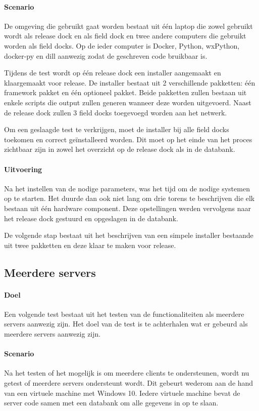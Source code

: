 \paragraph{Scenario}
De omgeving die gebruikt gaat worden bestaat uit één laptop die zowel gebruikt wordt als release dock en als field dock en twee andere computers die gebruikt worden als field docks.
Op de ieder computer is Docker, Python, wxPython, docker-py en dill aanwezig zodat de geschreven code bruikbaar is.

Tijdens de test wordt op één release dock een installer aangemaakt en klaargemaakt voor release.
De installer bestaat uit 2 verschillende pakketten: één framework pakket en één optioneel pakket.
Beide pakketten zullen bestaan uit enkele scripts die output zullen generen wanneer deze worden uitgevoerd.
Naast de release dock zullen 3 field docks toegevoegd worden aan het netwerk.

Om een geslaagde test te verkrijgen, moet de installer bij alle field docks toekomen en correct geïnstalleerd worden.
Dit moet op het einde van het proces zichtbaar zijn in zowel het overzicht op de release dock als in de databank.

\paragraph{Uitvoering}
Na het instellen van de nodige parameters, was het tijd om de nodige systemen op te starten.
Het duurde dan ook niet lang om drie torens te beschrijven die elk bestaan uit één hardware component.
Deze opstellingen werden vervolgens naar het release dock gestuurd en opgeslagen in de databank.

De volgende stap bestaat uit het beschrijven van een simpele installer bestaande uit twee pakketten en deze klaar te maken voor release.


\subsection{Meerdere servers}
\paragraph{Doel}
Een volgende test bestaat uit het testen van de functionaliteiten als meerdere servers aanwezig zijn.
Het doel van de test is te achterhalen wat er gebeurd als meerdere servers aanwezig zijn.

\paragraph{Scenario}
Na het testen of het mogelijk is om meerdere clients te ondersteunen, wordt nu getest of meerdere servers ondersteunt wordt.
Dit gebeurt wederom aan de hand van een virtuele machine met Windows 10.
Iedere virtuele machine bevat de server code samen met een databank om alle gegevens in op te slaan.

